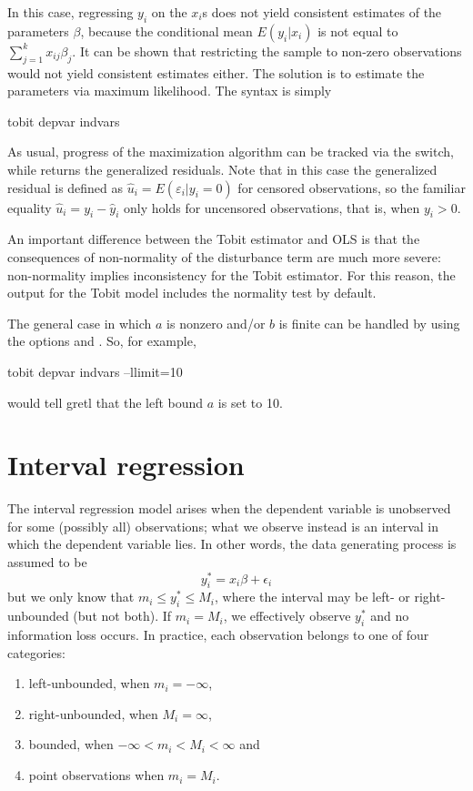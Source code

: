 In this case, regressing $y_i$ on the $x_i$s does not yield consistent
estimates of the parameters $\beta$, because the conditional mean
$E(y_i|x_i)$ is not equal to $\sum_{j=1}^k x_{ij} \beta_j$.  It can be
shown that restricting the sample to non-zero observations would not
yield consistent estimates either. The solution is to estimate the
parameters via maximum likelihood. The syntax is simply
\begin{code}
tobit depvar indvars
\end{code}

As usual, progress of the maximization algorithm can be tracked via
the  switch, while  returns the
generalized residuals. Note that in this case the generalized residual
is defined as $\hat{u}_i = E(\varepsilon_i | y_i = 0)$ for censored
observations, so the familiar equality $\hat{u}_i = y_i - \hat{y}_i$
only holds for uncensored observations, that is, when $y_i>0$.

An important difference between the Tobit estimator and OLS is that
the consequences of non-normality of the disturbance term are much
more severe: non-normality implies inconsistency for the Tobit
estimator. For this reason, the output for the Tobit model includes
the \cite{chesher-irish87} normality test by default.

The general case in which $a$ is nonzero and/or $b$ is finite can be
handled by using the options  and . So,
for example,
\begin{code}
tobit depvar indvars --llimit=10
\end{code}
would tell gretl that the left bound $a$ is set to 10.

\section{Interval regression}
\label{sec:intreg}

The interval regression model arises when the dependent variable is
unobserved for some (possibly all) observations; what we observe
instead is an interval in which the dependent variable lies.  In other
words, the data generating process is assumed to be
\[
  y^*_i = x_i \beta + \epsilon_i
\] 
but we only know that $m_i \le y^*_i \le M_i$, where the interval may
be left- or right-unbounded (but not both). If $m_i = M_i$, we
effectively observe $y^*_i$ and no information loss occurs. In
practice, each observation belongs to one of four categories:
\begin{enumerate}
\item left-unbounded, when $m_i = -\infty$,
\item right-unbounded, when $M_i = \infty$,
\item bounded, when $-\infty < m_i < M_i <\infty$ and
\item point observations when $m_i = M_i$.
\end{enumerate}

